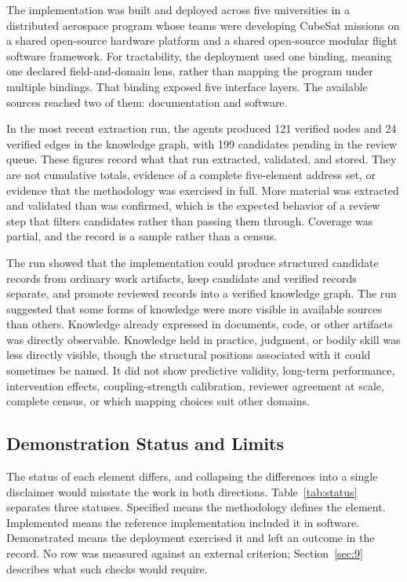 \documentclass[conference]{IEEEtran}
\begin{document}
The implementation was built and deployed across five universities in a distributed aerospace program whose teams were developing CubeSat missions on a shared open-source hardware platform and a shared open-source modular flight software framework. For tractability, the deployment used one binding, meaning one declared field-and-domain lens, rather than mapping the program under multiple bindings. That binding exposed five interface layers. The available sources reached two of them: documentation and software.

In the most recent extraction run, the agents produced 121 verified nodes and 24 verified edges in the knowledge graph, with 199 candidates pending in the review queue. These figures record what that run extracted, validated, and stored. They are not cumulative totals, evidence of a complete five-element address set, or evidence that the methodology was exercised in full. More material was extracted and validated than was confirmed, which is the expected behavior of a review step that filters candidates rather than passing them through. Coverage was partial, and the record is a sample rather than a census.

The run showed that the implementation could produce structured candidate records from ordinary work artifacts, keep candidate and verified records separate, and promote reviewed records into a verified knowledge graph. The run suggested that some forms of knowledge were more visible in available sources than others. Knowledge already expressed in documents, code, or other artifacts was directly observable. Knowledge held in practice, judgment, or bodily skill was less directly visible, though the structural positions associated with it could sometimes be named. It did not show predictive validity, long-term performance, intervention effects, coupling-strength calibration, reviewer agreement at scale, complete census, or which mapping choices suit other domains.

\subsection{Demonstration Status and Limits}\label{sec:7-3}

The status of each element differs, and collapsing the differences into a single disclaimer would misstate the work in both directions. Table~\ref{tab:status} separates three statuses. Specified means the methodology defines the element. Implemented means the reference implementation included it in software. Demonstrated means the deployment exercised it and left an outcome in the record. No row was measured against an external criterion; Section~\ref{sec:9} describes what such checks would require.
\end{document}
